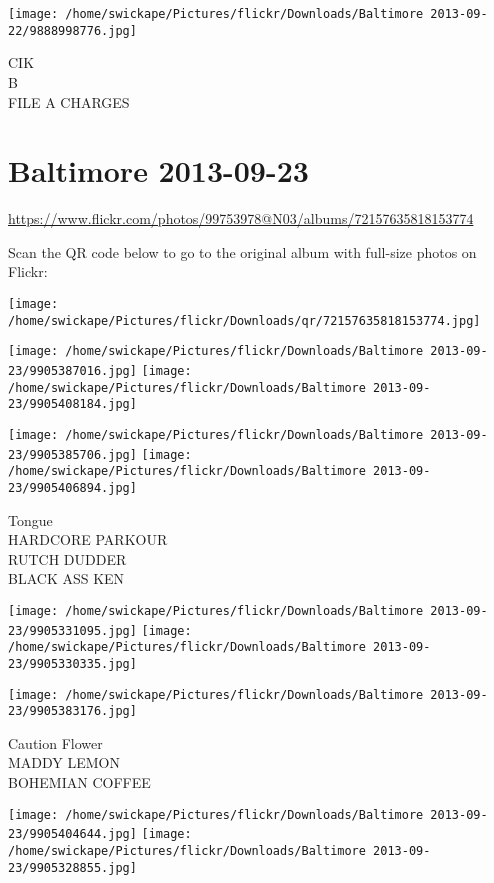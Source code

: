 \documentclass[10pt,letterpaper]{article}
\begin{document}
\vspace{0.25in}
\texttt{[image: /home/swickape/Pictures/flickr/Downloads/Baltimore 2013-09-22/9888998776.jpg]}

CIK\\
B\\
FILE A CHARGES
\pagebreak

\section*{Baltimore 2013-09-23}

\url{https://www.flickr.com/photos/99753978@N03/albums/72157635818153774}

Scan the QR code below to go to the original album with full-size photos on Flickr:

\texttt{[image: /home/swickape/Pictures/flickr/Downloads/qr/72157635818153774.jpg]}
\pagebreak

\texttt{[image: /home/swickape/Pictures/flickr/Downloads/Baltimore 2013-09-23/9905387016.jpg]}
\texttt{[image: /home/swickape/Pictures/flickr/Downloads/Baltimore 2013-09-23/9905408184.jpg]}

\texttt{[image: /home/swickape/Pictures/flickr/Downloads/Baltimore 2013-09-23/9905385706.jpg]}
\texttt{[image: /home/swickape/Pictures/flickr/Downloads/Baltimore 2013-09-23/9905406894.jpg]}

Tongue\\
HARDCORE PARKOUR\\
RUTCH DUDDER\\
BLACK ASS KEN
\pagebreak

\texttt{[image: /home/swickape/Pictures/flickr/Downloads/Baltimore 2013-09-23/9905331095.jpg]}
\texttt{[image: /home/swickape/Pictures/flickr/Downloads/Baltimore 2013-09-23/9905330335.jpg]}

\vspace{0.25in}
\texttt{[image: /home/swickape/Pictures/flickr/Downloads/Baltimore 2013-09-23/9905383176.jpg]}

Caution Flower\\
MADDY LEMON\\
BOHEMIAN COFFEE
\pagebreak

\texttt{[image: /home/swickape/Pictures/flickr/Downloads/Baltimore 2013-09-23/9905404644.jpg]}
\texttt{[image: /home/swickape/Pictures/flickr/Downloads/Baltimore 2013-09-23/9905328855.jpg]}
\end{document}
